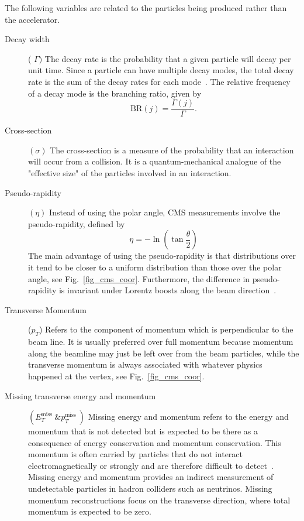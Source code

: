\begin{center}
  
  \label{fig_cms_coor}
\end{center}
The following variables are related to the particles being produced rather than the accelerator.
\begin{description}
	\item[Decay width] ( $\Gamma)$ The decay rate is the probability that a given particle will decay per unit time. Since a particle can have multiple decay modes, the total decay rate is the sum of the decay rates for each mode~\parencite{book:1123430}. The relative frequency of a decay mode is the branching ratio, given by
	$$
	\mathrm{BR}(j)=\frac{\Gamma(j)}{\Gamma} .
	$$
	\item[Cross-section] $(\sigma)$ The cross-section is a measure of the probability that an interaction will occur from a collision. It is a quantum-mechanical analogue of the "effective size" of the particles involved in an interaction.

	\item[Pseudo-rapidity] $(\eta)$ Instead of using the polar angle, CMS measurements involve the pseudo-rapidity, defined by
	$$
	\eta=-\ln \left(\tan \frac{\theta}{2}\right)
	$$
	The main advantage of using the pseudo-rapidity is that distributions over it tend to be closer to a uniform distribution than those over the polar angle, see Fig.~\ref{fig_cms_coor}. Furthermore, the difference in pseudo-rapidity is invariant under Lorentz boosts along the beam direction~\parencite{book:1123430}.
	\item[Transverse Momentum] ($p_T$) Refers to the component of momentum which is perpendicular to the beam line. It is usually preferred over full momentum because momentum along the beamline may just be left over from the beam particles, while the transverse momentum is always associated with whatever physics happened at the vertex, see Fig.~\ref{fig_cms_coor}.
	\item[Missing transverse energy and momentum] $\left(E_{T}^{\text {miss }} \& p_{T}^{\text {miss }}\right)$ Missing energy and momentum refers to the energy and momentum that is not detected but is expected to be there as a consequence of energy conservation and momentum conservation. This momentum is often carried by particles that do not interact electromagnetically or strongly and are therefore difficult to detect~\parencite{book:1123430}. Missing energy and momentum provides an indirect measurement of undetectable particles in hadron colliders such as neutrinos. Missing momentum reconstructions focus on the transverse direction, where total momentum is expected to be zero.
\end{description}


